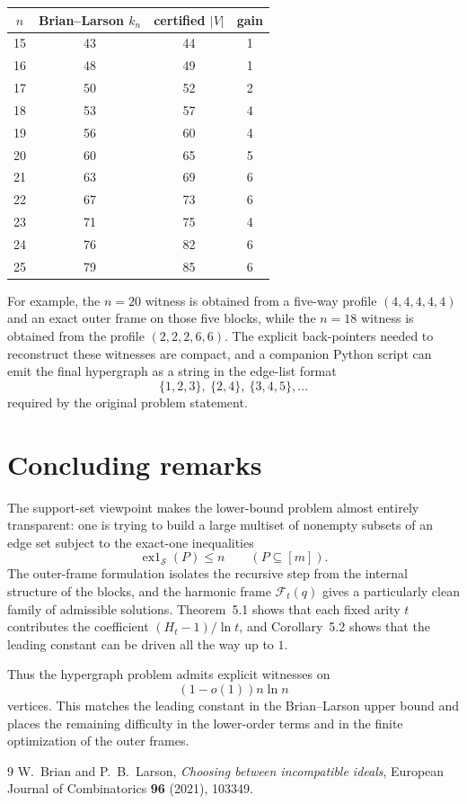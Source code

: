\documentclass[11pt]{article}
\begin{document}
\begin{center}
\begin{tabular}{@{}cccc@{}}
\toprule
$n$ & Brian--Larson $k_n$ & certified $|V|$ & gain \\
\midrule
15 & 43 & 44 & 1 \\
16 & 48 & 49 & 1 \\
17 & 50 & 52 & 2 \\
18 & 53 & 57 & 4 \\
19 & 56 & 60 & 4 \\
20 & 60 & 65 & 5 \\
21 & 63 & 69 & 6 \\
22 & 67 & 73 & 6 \\
23 & 71 & 75 & 4 \\
24 & 76 & 82 & 6 \\
25 & 79 & 85 & 6 \\
\bottomrule
\end{tabular}
\end{center}

For example, the $n=20$ witness is obtained from a five-way profile $(4,4,4,4,4)$ and an exact outer frame on those five blocks, while the $n=18$ witness is obtained from the profile $(2,2,2,6,6)$. The explicit back-pointers needed to reconstruct these witnesses are compact, and a companion Python script can emit the final hypergraph as a string in the edge-list format
\[
\{1,2,3\},\ \{2,4\},\ \{3,4,5\},\dots
\]
required by the original problem statement.

\section{Concluding remarks}

The support-set viewpoint makes the lower-bound problem almost entirely transparent: one is trying to build a large multiset of nonempty subsets of an edge set subject to the exact-one inequalities
\[
\operatorname{ex1}_{\mathcal S}(P) \le n \qquad (P \subseteq [m]).
\]
The outer-frame formulation isolates the recursive step from the internal structure of the blocks, and the harmonic frame $\mathcal F_t(q)$ gives a particularly clean family of admissible solutions. Theorem~5.1 shows that each fixed arity $t$ contributes the coefficient $(H_t - 1)/\ln t$, and Corollary~5.2 shows that the leading constant can be driven all the way up to $1$.

Thus the hypergraph problem admits explicit witnesses on
\[
(1-o(1)) n \ln n
\]
vertices. This matches the leading constant in the Brian--Larson upper bound and places the remaining difficulty in the lower-order terms and in the finite optimization of the outer frames.

\begin{thebibliography}{9}
W.~Brian and P.~B.~Larson,
\emph{Choosing between incompatible ideals},
European Journal of Combinatorics \textbf{96} (2021), 103349.
\end{thebibliography}
\end{document}
